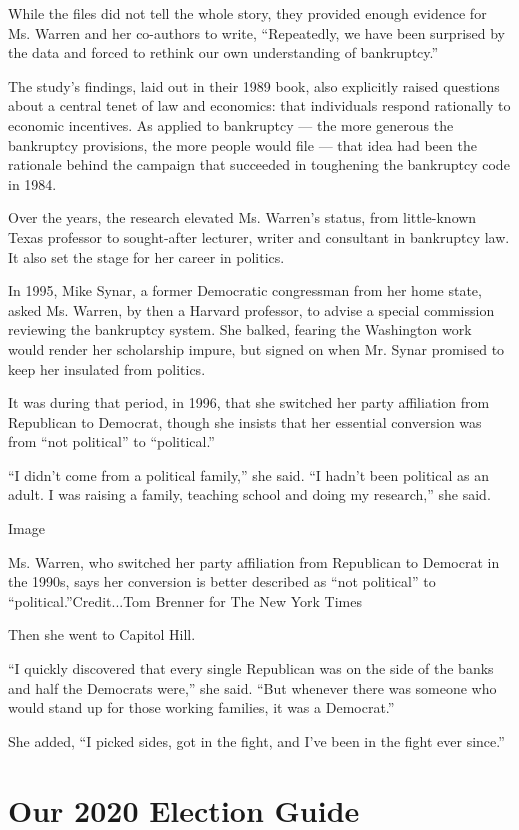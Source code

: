 While the files did not tell the whole story, they provided enough
evidence for Ms. Warren and her co-authors to write, ``Repeatedly, we
have been surprised by the data and forced to rethink our own
understanding of bankruptcy.''

The study's findings, laid out in their 1989 book, also explicitly
raised questions about a central tenet of law and economics: that
individuals respond rationally to economic incentives. As applied to
bankruptcy --- the more generous the bankruptcy provisions, the more
people would file --- that idea had been the rationale behind the
campaign that succeeded in toughening the bankruptcy code in 1984.

Over the years, the research elevated Ms. Warren's status, from
little-known Texas professor to sought-after lecturer, writer and
consultant in bankruptcy law. It also set the stage for her career in
politics.

In 1995, Mike Synar, a former Democratic congressman from her home
state, asked Ms. Warren, by then a Harvard professor, to advise a
special commission reviewing the bankruptcy system. She balked, fearing
the Washington work would render her scholarship impure, but signed on
when Mr. Synar promised to keep her insulated from politics.

It was during that period, in 1996, that she switched her party
affiliation from Republican to Democrat, though she insists that her
essential conversion was from ``not political'' to ``political.''

``I didn't come from a political family,'' she said. ``I hadn't been
political as an adult. I was raising a family, teaching school and doing
my research,'' she said.

Image

Ms. Warren, who switched her party affiliation from Republican to
Democrat in the 1990s, says her conversion is better described as ``not
political'' to ``political.''Credit...Tom Brenner for The New York Times

Then she went to Capitol Hill.

``I quickly discovered that every single Republican was on the side of
the banks and half the Democrats were,'' she said. ``But whenever there
was someone who would stand up for those working families, it was a
Democrat.''

She added, ``I picked sides, got in the fight, and I've been in the
fight ever since.''

\hypertarget{our-2020-election-guide}{%
\section{Our 2020 Election Guide}\label{our-2020-election-guide}}

